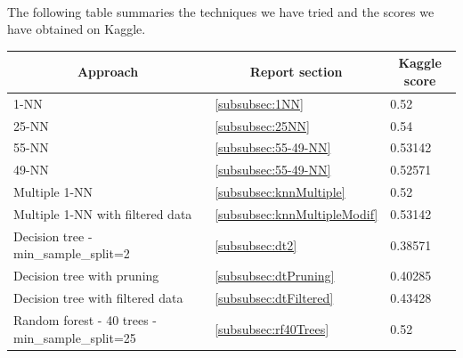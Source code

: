 \documentclass[a4paper, 11pt, oneside]{article}
\begin{document}
\paragraph{}The following table summaries the techniques we have tried and the scores we have obtained on Kaggle.
\begin{table}[H]
\centering
\begin{tabular}{|l|l|l|}
\hline
\multicolumn{1}{|c|}{\textbf{Approach}}                     & \multicolumn{1}{c|}{\textbf{Report section}} & \multicolumn{1}{c|}{\textbf{Kaggle score}} \\ \hline
1-NN                                                        & \ref{subsubsec:1NN}                          & 0.52                                       \\ \hline
25-NN                                                       & \ref{subsubsec:25NN}                         & 0.54                                       \\ \hline
55-NN                                                       & \ref{subsubsec:55-49-NN}                     & 0.53142                                    \\ \hline
49-NN                                                       & \ref{subsubsec:55-49-NN}                     & 0.52571                                    \\ \hline
Multiple 1-NN                                               & \ref{subsubsec:knnMultiple}                  & 0.52                                       \\ \hline
Multiple 1-NN with filtered data                            & \ref{subsubsec:knnMultipleModif}             & 0.53142                                    \\ \hline
Decision tree - min\_sample\_split=2                        & \ref{subsubsec:dt2}                          & 0.38571                                    \\ \hline
Decision tree with pruning                                  & \ref{subsubsec:dtPruning}                    & 0.40285                                    \\ \hline
Decision tree with filtered data                            & \ref{subsubsec:dtFiltered}                   & 0.43428                                    \\ \hline
Random forest - 40 trees - min\_sample\_split=25            & \ref{subsubsec:rf40Trees}                    & 0.52                                       \\ \hline

\end{tabular}
\end{table}
\end{document}
